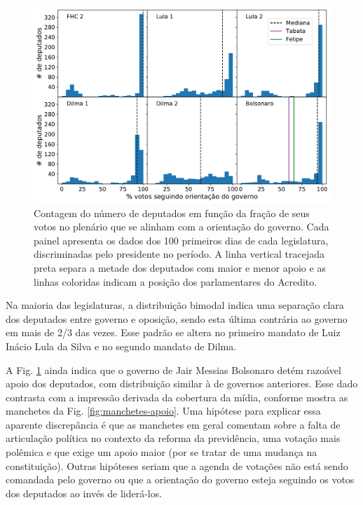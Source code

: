 \documentclass[12pt,a4paper]{article}
\begin{document}
\begin{figure}[t]
\centering
\includegraphics[width=1.0\textwidth]{graficos/apoio_ao_governo_deputados_2019-04-30.pdf}
\caption{Contagem do número de deputados em função da fração de seus votos no plenário que se
  alinham com a orientação do governo. Cada painel apresenta os dados dos 100 primeiros dias de
  cada legislatura, discriminadas pelo presidente no período. A linha vertical tracejada preta
  separa a metade dos deputados com maior e menor apoio e as linhas coloridas indicam a posição
  dos parlamentares do Acredito.}
\label{fig:apoio-governo-deputados}
\end{figure} 

Na maioria das legislaturas, a distribuição bimodal indica uma separação clara dos deputados
entre governo e oposição, sendo esta última contrária ao governo em mais de 2/3 das vezes.
Esse padrão se altera no primeiro mandato de Luiz Inácio Lula da Silva e no segundo mandato de Dilma.

A Fig. \ref{fig:apoio-governo-deputados} ainda indica que o governo de Jair Messias Bolsonaro detém
razoável apoio dos deputados, com distribuição similar à de governos anteriores. Esse dado contrasta
com a impressão derivada da cobertura da mídia, conforme mostra as manchetes da Fig. \ref{fig:manchetes-apoio}.
Uma hipótese para explicar essa aparente discrepância é que as manchetes em geral comentam sobre
a falta de articulação política no contexto da reforma da previdência, uma votação mais polêmica e
que exige um apoio maior (por se tratar de uma mudança na constituição). Outras hipóteses seriam
que a agenda de votações não está sendo comandada pelo governo ou que a orientação do governo esteja
seguindo os votos dos deputados ao invés de liderá-los.
\end{document}
